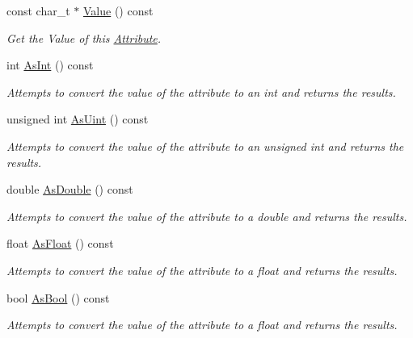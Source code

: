 \begin{DoxyCompactItemize}
const char\_\-t $\ast$ \hyperlink{classphys_1_1xml_1_1Attribute_a8a8099b39bca8894a8226ce0e82d3451}{Value} () const 
\begin{DoxyCompactList}\small\item\em Get the Value of this \hyperlink{classphys_1_1xml_1_1Attribute}{Attribute}. \item\end{DoxyCompactList}\item 
int \hyperlink{classphys_1_1xml_1_1Attribute_ada1f2e45ce636ad8482972263364e7fa}{AsInt} () const 
\begin{DoxyCompactList}\small\item\em Attempts to convert the value of the attribute to an int and returns the results. \item\end{DoxyCompactList}\item 
unsigned int \hyperlink{classphys_1_1xml_1_1Attribute_ad00ec5857fc4afcda892a0057419a9a0}{AsUint} () const 
\begin{DoxyCompactList}\small\item\em Attempts to convert the value of the attribute to an unsigned int and returns the results. \item\end{DoxyCompactList}\item 
double \hyperlink{classphys_1_1xml_1_1Attribute_a467ae167d5407ae3293a22b8873cb43a}{AsDouble} () const 
\begin{DoxyCompactList}\small\item\em Attempts to convert the value of the attribute to a double and returns the results. \item\end{DoxyCompactList}\item 
float \hyperlink{classphys_1_1xml_1_1Attribute_aad74f805b9318735011d698ee39113aa}{AsFloat} () const 
\begin{DoxyCompactList}\small\item\em Attempts to convert the value of the attribute to a float and returns the results. \item\end{DoxyCompactList}\item 
bool \hyperlink{classphys_1_1xml_1_1Attribute_a1c3e0f3a1722aac6a43daa135fdf622e}{AsBool} () const 
\begin{DoxyCompactList}\small\item\em Attempts to convert the value of the attribute to a float and returns the results. \item\end{DoxyCompactList}\item 

\end{DoxyCompactItemize}
